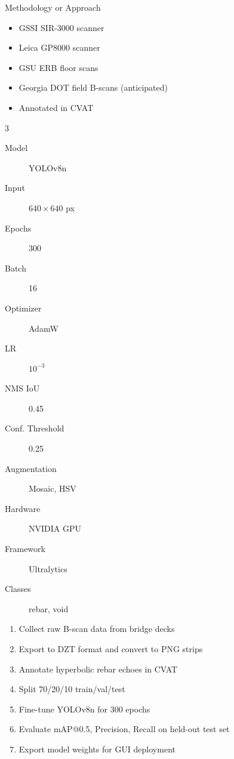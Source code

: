\documentclass[final, 16pt]{beamer}
\newlength{\colwidth}
\newlength{\twocolwidth}
\begin{document}
\begin{frame}[t]
\begin{columns}[t]
\begin{column}{\twocolwidth}
\begin{block}{Methodology or Approach}
    \begin{minipage}{0.24\linewidth}
      \begin{itemize}
        \item GSSI SIR-3000 scanner
        \item Leica GP8000 scanner
        \item GSU ERB floor scans
        \item Georgia DOT field B-scans (anticipated)
        \item Annotated in CVAT
      \end{itemize}
    \end{minipage}\hfill%
    \begin{minipage}{0.72\linewidth}
      \begin{multicols}{3}
      \begin{description}
        \item[Model] YOLOv8n
        \item[Input] $640\times640$ px
        \item[Epochs] 300
        \item[Batch] 16
        \item[Optimizer] AdamW
        \item[LR] $10^{-3}$
        \item[NMS IoU] 0.45
        \item[Conf. Threshold] 0.25
        \item[Augmentation] Mosaic, HSV
        \item[Hardware] NVIDIA GPU
        \item[Framework] Ultralytics
        \item[Classes] rebar, void
      \end{description}
    \end{multicols}
    \end{minipage}


    \begin{minipage}[t]{0.48\linewidth}
      \begin{enumerate}
        \item Collect raw B-scan data from bridge decks
        \item Export to DZT format and convert to PNG strips
        \item Annotate hyperbolic rebar echoes in CVAT
        \item Split 70/20/10 train/val/test
        \item Fine-tune YOLOv8n for 300 epochs
        \item Evaluate mAP@0.5, Precision, Recall on held-out test set
        \item Export model weights for GUI deployment
      \end{enumerate}


\end{minipage}
\end{block}
\end{column}
\end{columns}
\end{frame}
\end{document}
